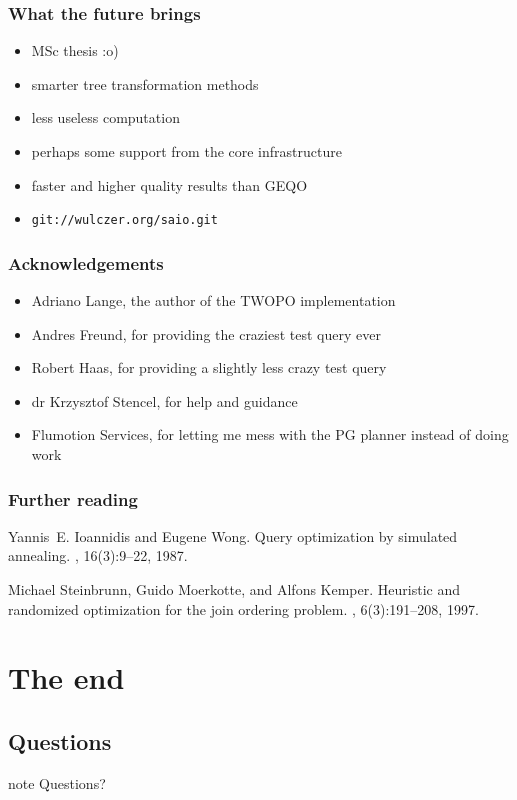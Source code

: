 \documentclass{beamer}
\begin{document}
\begin{frame}
  \frametitle{What the future brings}

  \begin{itemize}
  \item MSc thesis :o)
  \item smarter tree transformation methods
  \item less useless computation
  \item perhaps some support from the core infrastructure
  \item faster and higher quality results than GEQO
  \item \texttt{git://wulczer.org/saio.git}
  \end{itemize}
\end{frame}

\begin{frame}
  \frametitle{Acknowledgements}

  \begin{itemize}
  \item Adriano Lange, the author of the TWOPO implementation
  \item Andres Freund, for providing the craziest test query ever
  \item Robert Haas, for providing a slightly less crazy test query
  \item dr Krzysztof Stencel, for help and guidance
  \item Flumotion Services, for letting me mess with the PG planner instead of
    doing work
  \end{itemize}
\end{frame}

\begin{frame}
  \frametitle{Further reading}

  \begin{thebibliography}{Steinbrunn 1997}

    Yannis~E. Ioannidis and Eugene Wong.
    \newblock Query optimization by simulated annealing.
    , 16(3):9--22, 1987.

    Michael Steinbrunn, Guido Moerkotte, and Alfons Kemper.
    \newblock Heuristic and randomized optimization for the join ordering problem.
    , 6(3):191--208, 1997.

  \end{thebibliography}
\end{frame}

\section{The end}
\subsection*{Questions}

\begin{frame}
\begin{beamercolorbox}[center]{note}
  \Huge Questions?
\end{beamercolorbox}
\end{frame}

\appendix

\end{document}

